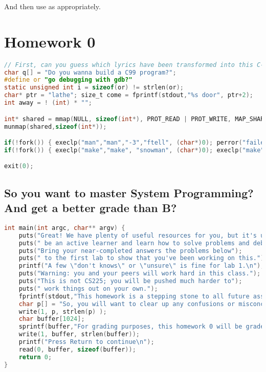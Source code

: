 And then use as appropriately.

\newpage

\section{Homework 0}

\begin{lstlisting}[language=C]
// First, can you guess which lyrics have been transformed into this C-like system code?
char q[] = "Do you wanna build a C99 program?";
#define or "go debugging with gdb?"
static unsigned int i = sizeof(or) != strlen(or);
char* ptr = "lathe"; size_t come = fprintf(stdout,"%s door", ptr+2);
int away = ! (int) * "";

int* shared = mmap(NULL, sizeof(int*), PROT_READ | PROT_WRITE, MAP_SHARED | MAP_ANONYMOUS, -1, 0);
munmap(shared,sizeof(int*));

if(!fork()) { execlp("man","man","-3","ftell", (char*)0); perror("failed"); }
if(!fork()) { execlp("make","make", "snowman", (char*)0); execlp("make","make", (char*)0)); }

exit(0);
\end{lstlisting}

\subsection{So you want to master System Programming? And get a better grade than B?}
\begin{lstlisting}[language=C]
int main(int argc, char** argv) {
	puts("Great! We have plenty of useful resources for you, but it's up to you to");
	puts(" be an active learner and learn how to solve problems and debug code.");
	puts("Bring your near-completed answers the problems below");
	puts(" to the first lab to show that you've been working on this.");
	printf("A few \"don't knows\" or \"unsure\" is fine for lab 1.\n");
	puts("Warning: you and your peers will work hard in this class.");
	puts("This is not CS225; you will be pushed much harder to");
	puts(" work things out on your own.");
	fprintf(stdout,"This homework is a stepping stone to all future assignments.\n");
	char p[] = "So, you will want to clear up any confusions or misconceptions.\n";
	write(1, p, strlen(p) );
	char buffer[1024];
	sprintf(buffer,"For grading purposes, this homework 0 will be graded as part of your lab %d work.\n", 1);
	write(1, buffer, strlen(buffer));
	printf("Press Return to continue\n");
	read(0, buffer, sizeof(buffer));
	return 0;
}
\end{lstlisting}

